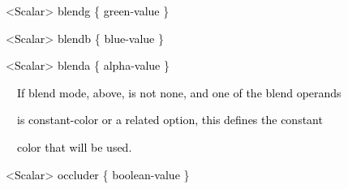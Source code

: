 \documentclass[a4paper]{article}
\newcommand\textstyleOOoComputerKeyWord[1]{\textrm{\textcolor[rgb]{0.0,0.0,0.5019608}{#1}}}
\newcommand\textstyleOOoAssemblerSpecialChar[1]{\textrm{\textcolor[rgb]{0.0,0.5019608,0.0}{#1}}}
\newcommand\textstyleOOoAssemblerIdent[1]{\textrm{\textcolor{black}{#1}}}
\begin{document}
{\color{black}
\textstyleOOoComputerKeyWord{\textcolor{black}{\ \ }}\textstyleOOoAssemblerSpecialChar{{\textless}}\textstyleOOoAssemblerIdent{Scalar}\textstyleOOoAssemblerSpecialChar{{\textgreater}}\textstyleOOoComputerKeyWord{\textcolor{black}{
}}\textstyleOOoAssemblerIdent{blendg}\textstyleOOoComputerKeyWord{\textcolor{black}{
}}\textstyleOOoAssemblerSpecialChar{\{}\textstyleOOoComputerKeyWord{\textcolor{black}{
}}\textstyleOOoAssemblerIdent{green}\textstyleOOoAssemblerSpecialChar{{}-}\textstyleOOoAssemblerIdent{value}\textstyleOOoComputerKeyWord{\textcolor{black}{
}}\textstyleOOoAssemblerSpecialChar{\}}}

{\color{black}
\textstyleOOoComputerKeyWord{\textcolor{black}{\ \ }}\textstyleOOoAssemblerSpecialChar{{\textless}}\textstyleOOoAssemblerIdent{Scalar}\textstyleOOoAssemblerSpecialChar{{\textgreater}}\textstyleOOoComputerKeyWord{\textcolor{black}{
}}\textstyleOOoAssemblerIdent{blendb}\textstyleOOoComputerKeyWord{\textcolor{black}{
}}\textstyleOOoAssemblerSpecialChar{\{}\textstyleOOoComputerKeyWord{\textcolor{black}{
}}\textstyleOOoAssemblerIdent{blue}\textstyleOOoAssemblerSpecialChar{{}-}\textstyleOOoAssemblerIdent{value}\textstyleOOoComputerKeyWord{\textcolor{black}{
}}\textstyleOOoAssemblerSpecialChar{\}}}

{\color{black}
\textstyleOOoComputerKeyWord{\textcolor{black}{\ \ }}\textstyleOOoAssemblerSpecialChar{{\textless}}\textstyleOOoAssemblerIdent{Scalar}\textstyleOOoAssemblerSpecialChar{{\textgreater}}\textstyleOOoComputerKeyWord{\textcolor{black}{
}}\textstyleOOoAssemblerIdent{blenda}\textstyleOOoComputerKeyWord{\textcolor{black}{
}}\textstyleOOoAssemblerSpecialChar{\{}\textstyleOOoComputerKeyWord{\textcolor{black}{
}}\textstyleOOoAssemblerIdent{alpha}\textstyleOOoAssemblerSpecialChar{{}-}\textstyleOOoAssemblerIdent{value}\textstyleOOoComputerKeyWord{\textcolor{black}{
}}\textstyleOOoAssemblerSpecialChar{\}}}


\bigskip

{\color{black}
\textstyleOOoComputerKeyWord{\textcolor{black}{\ \ \ \ If blend mode, above, is not none, and one of the blend
operands}}}

{\color{black}
\textstyleOOoComputerKeyWord{\textcolor{black}{\ \ \ \ is constant-color or a related option, this defines the
constant}}}

{\color{black}
\textstyleOOoComputerKeyWord{\textcolor{black}{\ \ \ \ color that will be used.}}}


\bigskip

{\color{black}
\textstyleOOoComputerKeyWord{\textcolor{black}{\ \ }}\textstyleOOoAssemblerSpecialChar{{\textless}}\textstyleOOoAssemblerIdent{Scalar}\textstyleOOoAssemblerSpecialChar{{\textgreater}}\textstyleOOoComputerKeyWord{\textcolor{black}{
}}\textstyleOOoAssemblerIdent{occluder}\textstyleOOoComputerKeyWord{\textcolor{black}{
}}\textstyleOOoAssemblerSpecialChar{\{}\textstyleOOoComputerKeyWord{\textcolor{black}{
}}\textstyleOOoAssemblerIdent{boolean}\textstyleOOoAssemblerSpecialChar{{}-}\textstyleOOoAssemblerIdent{value}\textstyleOOoComputerKeyWord{\textcolor{black}{
}}\textstyleOOoAssemblerSpecialChar{\}}}
\end{document}
